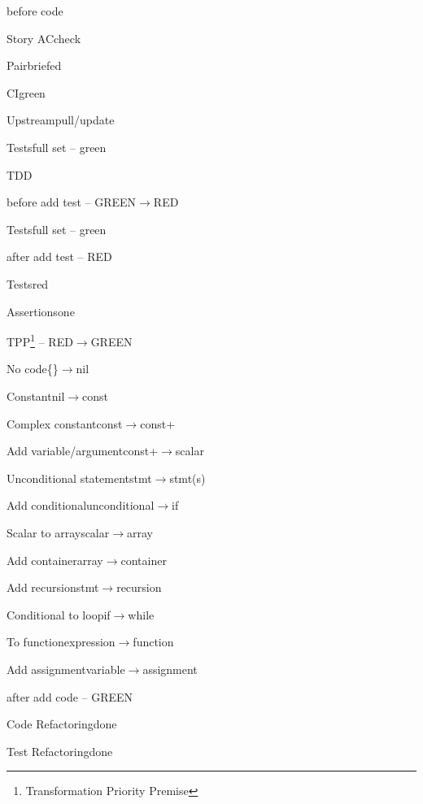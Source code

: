 




\begin{checklist}{before code}
  \item{Story AC}{check}
  \item{Pair}{briefed}
  \item{CI}{green}
  \item{Upstream}{pull/update}
  \item{Tests}{full set -- green}
\end{checklist}

\begin{task}{TDD}

  \begin{checklist}{before add test -- GREEN$\rightarrow$RED}
    \item{Tests}{full set -- green}
  \end{checklist}

  \begin{checklist}{after add test -- RED}
    \item{Tests}{red}
    \item{Assertions}{one}
  \end{checklist}

  \begin{checklist}{TPP\footnote{Transformation Priority Premise} -- RED$\rightarrow$GREEN}
    \item{No code}{\{\}$\rightarrow$nil}
    \item{Constant}{nil$\rightarrow$const}
    \item{Complex constant}{const$\rightarrow$const+}
    \item{Add variable/argument}{const+$\rightarrow$scalar}
    \item{Unconditional statement}{stmt$\rightarrow$stmt(s)}
    \item{Add conditional}{unconditional$\rightarrow$if}
    \item{Scalar to array}{scalar$\rightarrow$array}
    \item{Add container}{array$\rightarrow$container}
    \item{Add recursion}{stmt$\rightarrow$recursion}
    \item{Conditional to loop}{if$\rightarrow$while}
    \item{To function}{expression$\rightarrow$function}
    \item{Add assignment}{variable$\rightarrow$assignment}
  \end{checklist}

  \begin{checklist}{after add code -- GREEN}
    \item{Code Refactoring}{done}
    \item{Test Refactoring}{done}
  \end{checklist}

\end{task}

